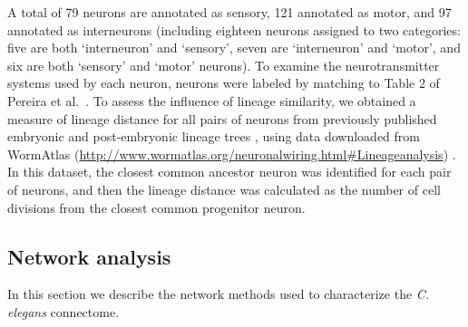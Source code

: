 \documentclass[10pt,letterpaper]{article}
\begin{document}
A total of 79 neurons are annotated as sensory, 121 annotated as motor, and 97 annotated as interneurons (including eighteen neurons assigned to two categories: five are both `interneuron' and `sensory', seven are `interneuron' and `motor', and six are both `sensory' and `motor' neurons).
To examine the neurotransmitter systems used by each neuron, neurons were labeled by matching to Table 2 of Pereira et al.~\cite{Pereira:2015er}.
To assess the influence of lineage similarity, we obtained a measure of lineage distance for all pairs of neurons from previously published embryonic and post-embryonic lineage trees \cite{Sulston1977, Sulston1983}, using data downloaded from WormAtlas (\url{http://www.wormatlas.org/neuronalwiring.html#Lineageanalysis}) \cite{WormAtlas}.
In this dataset, the closest common ancestor neuron was identified for each pair of neurons, and then the lineage distance was calculated as the number of cell divisions from the closest common progenitor neuron.

\subsection*{Network analysis}
In this section we describe the network methods used to characterize the \emph{C. elegans} connectome.
\end{document}
